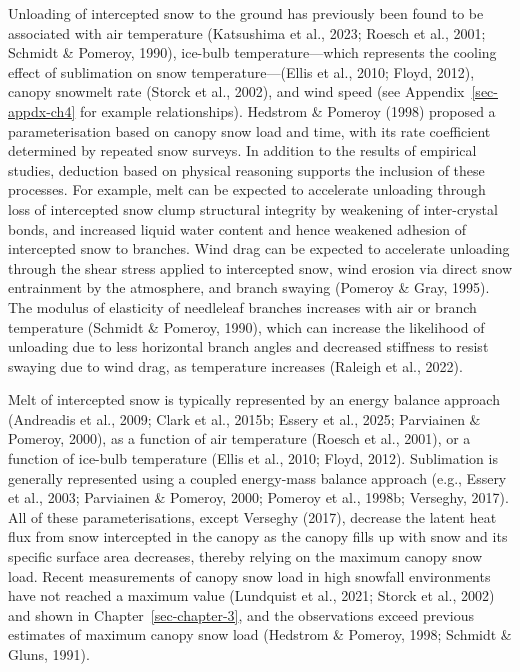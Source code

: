 \documentclass[
  letterpaper,
]{tex/uofsthesis-cs}
\begin{document}
Unloading of intercepted snow to the ground has previously been found to
be associated with air temperature (Katsushima et al., 2023; Roesch et
al., 2001; Schmidt \& Pomeroy, 1990), ice-bulb temperature---which
represents the cooling effect of sublimation on snow
temperature---(Ellis et al., 2010; Floyd, 2012), canopy snowmelt rate
(Storck et al., 2002), and wind speed (see Appendix~\ref{sec-appdx-ch4}
for example relationships). Hedstrom \& Pomeroy (1998) proposed a
parameterisation based on canopy snow load and time, with its rate
coefficient determined by repeated snow surveys. In addition to the
results of empirical studies, deduction based on physical reasoning
supports the inclusion of these processes. For example, melt can be
expected to accelerate unloading through loss of intercepted snow clump
structural integrity by weakening of inter-crystal bonds, and increased
liquid water content and hence weakened adhesion of intercepted snow to
branches. Wind drag can be expected to accelerate unloading through the
shear stress applied to intercepted snow, wind erosion via direct snow
entrainment by the atmosphere, and branch swaying (Pomeroy \& Gray,
1995). The modulus of elasticity of needleleaf branches increases with
air or branch temperature (Schmidt \& Pomeroy, 1990), which can increase
the likelihood of unloading due to less horizontal branch angles and
decreased stiffness to resist swaying due to wind drag, as temperature
increases (Raleigh et al., 2022).

Melt of intercepted snow is typically represented by an energy balance
approach (Andreadis et al., 2009; Clark et al., 2015b; Essery et al.,
2025; Parviainen \& Pomeroy, 2000), as a function of air temperature
(Roesch et al., 2001), or a function of ice-bulb temperature (Ellis et
al., 2010; Floyd, 2012). Sublimation is generally represented using a
coupled energy-mass balance approach (e.g., Essery et al., 2003;
Parviainen \& Pomeroy, 2000; Pomeroy et al., 1998b; Verseghy, 2017). All
of these parameterisations, except Verseghy (2017), decrease the latent
heat flux from snow intercepted in the canopy as the canopy fills up
with snow and its specific surface area decreases, thereby relying on
the maximum canopy snow load. Recent measurements of canopy snow load in
high snowfall environments have not reached a maximum value (Lundquist
et al., 2021; Storck et al., 2002) and shown in
Chapter~\ref{sec-chapter-3}, and the observations exceed previous
estimates of maximum canopy snow load (Hedstrom \& Pomeroy, 1998;
Schmidt \& Gluns, 1991).
\end{document}
